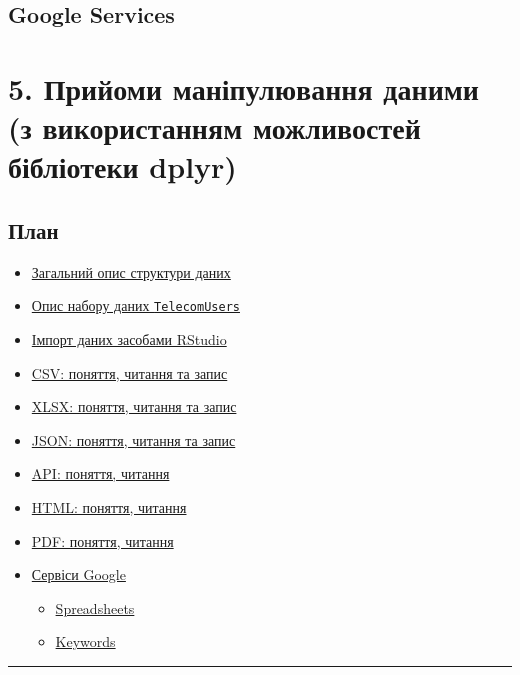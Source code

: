 \documentclass[
]{book}
\providecommand{\tightlist}{%
  \setlength{\itemsep}{0pt}\setlength{\parskip}{0pt}}
\begin{document}
\hypertarget{chapter46}{%
\section{Google Services}\label{chapter46}}

\hypertarget{chapter5}{%
\chapter{5. Прийоми маніпулювання даними (з використанням можливостей бібліотеки dplyr)}\label{chapter5}}

\hypertarget{ux43fux43bux430ux43d-4}{%
\section*{План}\label{ux43fux43bux430ux43d-4}}

\begin{itemize}
\tightlist
\item
  \protect\hyperlink{chapter41}{Загальний опис структури даних}
\item
  \protect\hyperlink{chapter42}{Опис набору даних \texttt{TelecomUsers}}
\item
  \protect\hyperlink{chapter43}{Імпорт даних засобами RStudio}
\item
  \protect\hyperlink{chapter42}{CSV: поняття, читання та запис}
\item
  \protect\hyperlink{chapter44}{XLSX: поняття, читання та запис}
\item
  \protect\hyperlink{chapter45}{JSON: поняття, читання та запис}
\item
  \protect\hyperlink{chapter46}{API: поняття, читання}
\item
  \protect\hyperlink{chapter47}{HTML: поняття, читання}
\item
  \protect\hyperlink{chapter48}{PDF: поняття, читання}
\item
  \protect\hyperlink{chapter48}{Сервіси Google}

  \begin{itemize}
  \tightlist
  \item
    \protect\hyperlink{chapter48}{Spreadsheets}
  \item
    \protect\hyperlink{chapter48}{Keywords}
  \end{itemize}
\end{itemize}

\begin{center}\rule{0.5\linewidth}{0.5pt}\end{center}
\end{document}
